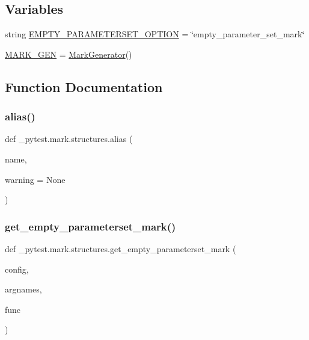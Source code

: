 \subsection*{Variables}
\begin{DoxyCompactItemize}
\item 
string \hyperlink{namespace__pytest_1_1mark_1_1structures_a71013ca34a3bc8259d61499090a7e5ff}{E\+M\+P\+T\+Y\+\_\+\+P\+A\+R\+A\+M\+E\+T\+E\+R\+S\+E\+T\+\_\+\+O\+P\+T\+I\+ON} = \char`\"{}empty\+\_\+parameter\+\_\+set\+\_\+mark\char`\"{}
\item 
\hyperlink{namespace__pytest_1_1mark_1_1structures_ae733896857deec292acbe70730f33a2b}{M\+A\+R\+K\+\_\+\+G\+EN} = \hyperlink{class__pytest_1_1mark_1_1structures_1_1_mark_generator}{Mark\+Generator}()
\end{DoxyCompactItemize}


\subsection{Function Documentation}
\mbox{\label{namespace__pytest_1_1mark_1_1structures_ad83334f8dce602c786ff6ae0a632e052}} 
\subsubsection{\texorpdfstring{alias()}{alias()}}
{\footnotesize\ttfamily def \+\_\+pytest.\+mark.\+structures.\+alias (\begin{DoxyParamCaption}\item[{}]{name,  }\item[{}]{warning = {\ttfamily None} }\end{DoxyParamCaption})}

\mbox{\label{namespace__pytest_1_1mark_1_1structures_aa466544284120d2f2e22b14dea034266}} 
\subsubsection{\texorpdfstring{get\+\_\+empty\+\_\+parameterset\+\_\+mark()}{get\_empty\_parameterset\_mark()}}
{\footnotesize\ttfamily def \+\_\+pytest.\+mark.\+structures.\+get\+\_\+empty\+\_\+parameterset\+\_\+mark (\begin{DoxyParamCaption}\item[{}]{config,  }\item[{}]{argnames,  }\item[{}]{func }\end{DoxyParamCaption})}

